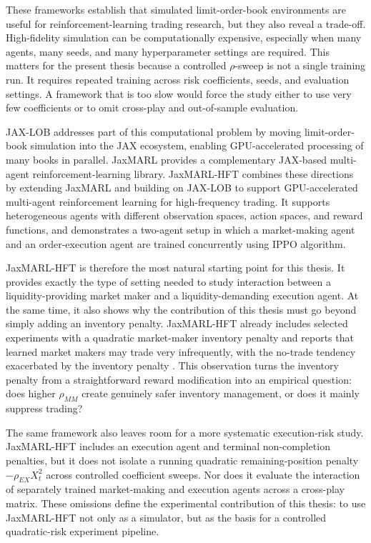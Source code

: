 \documentclass[oneside]{uva-inf-bachelor-thesis}
\begin{document}
These frameworks establish that simulated limit-order-book environments are useful for reinforcement-learning trading research, but they also reveal a trade-off. High-fidelity simulation can be computationally expensive, especially when many agents, many seeds, and many hyperparameter settings are required. This matters for the present thesis because a controlled \(\rho\)-sweep is not a single training run. It requires repeated training across risk coefficients, seeds, and evaluation settings. A framework that is too slow would force the study either to use very few coefficients or to omit cross-play and out-of-sample evaluation.

JAX-LOB \cite{frey_jax-lob_2023} addresses part of this computational problem by moving limit-order-book simulation into the JAX ecosystem, enabling GPU-accelerated processing of many books in parallel. JaxMARL \cite{rutherford_jaxmarl_2023} provides a complementary JAX-based multi-agent reinforcement-learning library. JaxMARL-HFT \cite{mohl_jaxmarl-hft_2025} combines these directions by extending JaxMARL and building on JAX-LOB to support GPU-accelerated multi-agent reinforcement learning for high-frequency trading. It supports heterogeneous agents with different observation spaces, action spaces, and reward functions, and demonstrates a two-agent setup in which a market-making agent and an order-execution agent are trained concurrently using IPPO algorithm.

JaxMARL-HFT is therefore the most natural starting point for this thesis. It provides exactly the type of setting needed to study interaction between a liquidity-providing market maker and a liquidity-demanding execution agent. At the same time, it also shows why the contribution of this thesis must go beyond simply adding an inventory penalty. JaxMARL-HFT already includes selected experiments with a quadratic market-maker inventory penalty and reports that learned market makers may trade very infrequently, with the no-trade tendency exacerbated by the inventory penalty \cite{mohl_jaxmarl-hft_2025}. This observation turns the inventory penalty from a straightforward reward modification into an empirical question: does higher \(\rho_{MM}\) create genuinely safer inventory management, or does it mainly suppress trading?

The same framework also leaves room for a more systematic execution-risk study. JaxMARL-HFT includes an execution agent and terminal non-completion penalties, but it does not isolate a running quadratic remaining-position penalty \(-\rho_{EX}X_t^2\) across controlled coefficient sweeps. Nor does it evaluate the interaction of separately trained market-making and execution agents across a cross-play matrix. These omissions define the experimental contribution of this thesis: to use JaxMARL-HFT not only as a simulator, but as the basis for a controlled quadratic-risk experiment pipeline.
\end{document}
